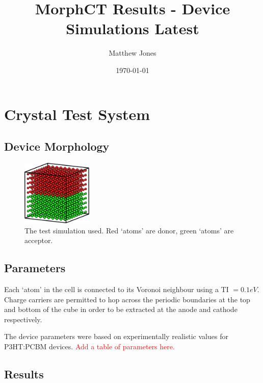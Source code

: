 \documentclass[12pt]{article}
\title{MorphCT Results - Device Simulations Latest}
\author{Matthew Jones}
\date{\today}
\begin{document}
\maketitle


\section{Crystal Test System}


\subsection{Device Morphology}

\begin{figure}[h!]\centering
	\includegraphics[width=0.3\textwidth]{Figures/device.png}
    \caption{The test simulation used. Red `atoms' are donor, green `atoms' are acceptor.}
	\label{fig:device}
\end{figure}



\subsection{Parameters}

Each `atom' in the cell is connected to its Voronoi neighbour using a TI $= 0.1 eV$.
Charge carriers are permitted to hop across the periodic boundaries at the top and bottom of the cube in order to be extracted at the anode and cathode respectively.

The device parameters were based on experimentally realistic values for P3HT:PCBM devices.
\textcolor{red}{Add a table of parameters here.}


\subsection{Results}
\end{document}
